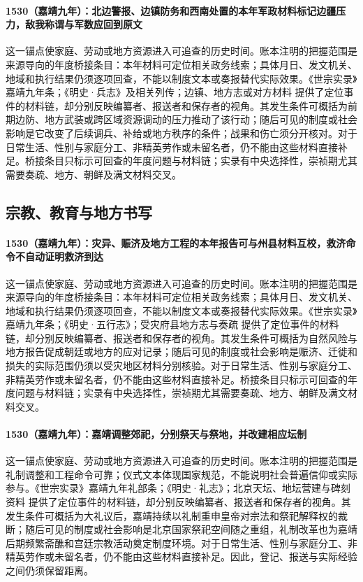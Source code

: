 \paragraph{1530（嘉靖九年）：北边警报、边镇防务和西南处置的本年军政材料标记边疆压力，敌我称谓与军数应回到原文} 这一锚点使家庭、劳动或地方资源进入可追查的历史时间。账本注明的把握范围是来源导向的年度桥接条目：本年材料可定位相关政务线索；具体月日、发文机关、地域和执行结果仍须逐项回查，不能以制度文本或奏报替代实际效果。《世宗实录》嘉靖九年条；《明史·兵志》及相关列传；边镇、地方志或对方材料 提供了定位事件的材料链，却分别反映编纂者、报送者和保存者的视角。其发生条件可概括为前期边防、地方武装或跨区域资源调动的压力推动了该行动；随后可见的制度或社会影响是它改变了后续调兵、补给或地方秩序的条件；战果和伤亡须分开核对。对于日常生活、性别与家庭分工、非精英劳作或未留名者，仍不能由这些材料直接补足。桥接条目只标示可回查的年度问题与材料链；实录有中央选择性，崇祯期尤其需要奏疏、地方、朝鲜及满文材料交叉。

\subsection{宗教、教育与地方书写}

\paragraph{1530（嘉靖九年）：灾异、赈济及地方工程的本年报告可与州县材料互校，救济命令不自动证明救济到达} 这一锚点使家庭、劳动或地方资源进入可追查的历史时间。账本注明的把握范围是来源导向的年度桥接条目：本年材料可定位相关政务线索；具体月日、发文机关、地域和执行结果仍须逐项回查，不能以制度文本或奏报替代实际效果。《世宗实录》嘉靖九年条；《明史·五行志》；受灾府县地方志与奏疏 提供了定位事件的材料链，却分别反映编纂者、报送者和保存者的视角。其发生条件可概括为自然风险与地方报告促成朝廷或地方的应对记录；随后可见的制度或社会影响是赈济、迁徙和损失的实际范围仍须以受灾地区材料分别核验。对于日常生活、性别与家庭分工、非精英劳作或未留名者，仍不能由这些材料直接补足。桥接条目只标示可回查的年度问题与材料链；实录有中央选择性，崇祯期尤其需要奏疏、地方、朝鲜及满文材料交叉。

\paragraph{1530（嘉靖九年）：嘉靖调整郊祀，分别祭天与祭地，并改建相应坛制} 这一锚点使家庭、劳动或地方资源进入可追查的历史时间。账本注明的把握范围是礼制调整和工程命令可靠；仪式文本体现国家规范，不能说明社会普遍信仰或实际参与。《世宗实录》嘉靖九年礼部条；《明史·礼志》；北京天坛、地坛营建与碑刻资料 提供了定位事件的材料链，却分别反映编纂者、报送者和保存者的视角。其发生条件可概括为大礼议后，嘉靖持续以礼制重申皇帝对宗法和祭祀解释权的裁断；随后可见的制度或社会影响是北京国家祭祀空间随之重组，礼制改革也为嘉靖后期频繁斋醮和宫廷宗教活动奠定制度环境。对于日常生活、性别与家庭分工、非精英劳作或未留名者，仍不能由这些材料直接补足。因此，登记、报送与实际经验之间仍须保留距离。

